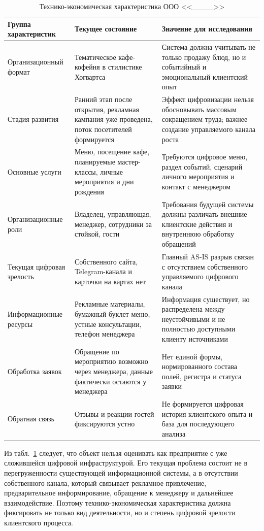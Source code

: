 \begin{table}[H]
\centering
\small
\caption{Технико-экономическая характеристика ООО <<\_\_\_\_>>}
\label{tab:ch2_object_characteristics}
\begin{tabularx}{\textwidth}{|>{\raggedright\arraybackslash}p{}|>{\raggedright\arraybackslash}p{}|>{\raggedright\arraybackslash}X|}
\hline
\textbf{Группа характеристик} & \textbf{Текущее состояние} & \textbf{Значение для исследования} \\ \hline
Организационный формат & Тематическое кафе-кофейня в стилистике Хогвартса & Система должна учитывать не только продажу блюд, но и событийный и эмоциональный клиентский опыт \\ \hline
Стадия развития & Ранний этап после открытия, рекламная кампания уже проведена, поток посетителей формируется & Эффект цифровизации нельзя обосновывать массовым сокращением труда; важнее создание управляемого канала роста \\ \hline
Основные услуги & Меню, посещение кафе, планируемые мастер-классы, личные мероприятия и дни рождения & Требуются цифровое меню, раздел событий, сценарий личного мероприятия и контакт с менеджером \\ \hline
Организационные роли & Владелец, управляющая, менеджер, сотрудники за стойкой, гости & Требования будущей системы должны различать внешние клиентские действия и внутреннюю обработку обращений \\ \hline
Текущая цифровая зрелость & Собственного сайта, Telegram-канала и карточки на картах нет & Главный AS-IS разрыв связан с отсутствием собственного управляемого цифрового канала \\ \hline
Информационные ресурсы & Рекламные материалы, бумажный буклет меню, устные консультации, телефон менеджера & Информация существует, но распределена между неустойчивыми и не полностью доступными клиенту источниками \\ \hline
Обработка заявок & Обращение по мероприятию возможно через менеджера, данные фактически остаются у менеджера & Нет единой формы, нормированного состава полей, регистра и статуса заявки \\ \hline
Обратная связь & Отзывы и реакции гостей фиксируются устно & Не формируется цифровая история клиентского опыта и база для последующего анализа \\ \hline
\end{tabularx}
\normalsize
\end{table}

Из табл.~\ref{tab:ch2_object_characteristics} следует, что объект нельзя оценивать как предприятие с уже сложившейся цифровой инфраструктурой. Его текущая проблема состоит не в перегруженности существующей информационной системы, а в отсутствии собственного канала, который связывает рекламное привлечение, предварительное информирование, обращение к менеджеру и дальнейшее взаимодействие. Поэтому технико-экономическая характеристика должна фиксировать не только вид деятельности, но и степень цифровой зрелости клиентского процесса.

